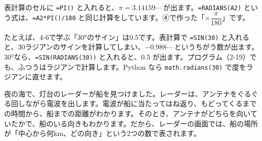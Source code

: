 表計算のセルに \texttt{=PI()} と入れると、$\pi=3.14159\cdots$ が出ます。\texttt{=RADIANS(A2)} という式は、\texttt{=A2*PI()/180} と同じ計算をしています。④で作った「$\times\dfrac{\pi}{180}$」です。

たとえば、4-6で学ぶ「30°のサイン」は0.5です。表計算で \texttt{=SIN(30)} と入れると、30ラジアンのサインを計算してしまい、$-0.988\cdots$ というちがう数が出ます。30°なら、\texttt{=SIN(RADIANS(30))} と入れると、0.5 が出ます。プログラム（2-19）でも、ふつうはラジアンで計算します。Python なら \texttt{math.radians(30)} で度をラジアンに直せます。


\leavevmode\label{bk:4-2:kyoku}夜の海で、灯台のレーダーが船を見つけました。レーダーは、アンテナをぐるぐる回しながら電波を出します。電波が船に当たってはね返り、もどってくるまでの時間から、船までの距離がわかります。そのとき、アンテナがどちらを向いていたかで、船のいる向きもわかります。だから、レーダーの画面では、船の場所が「中心から何km、どの向き」という2つの数で表されます。

